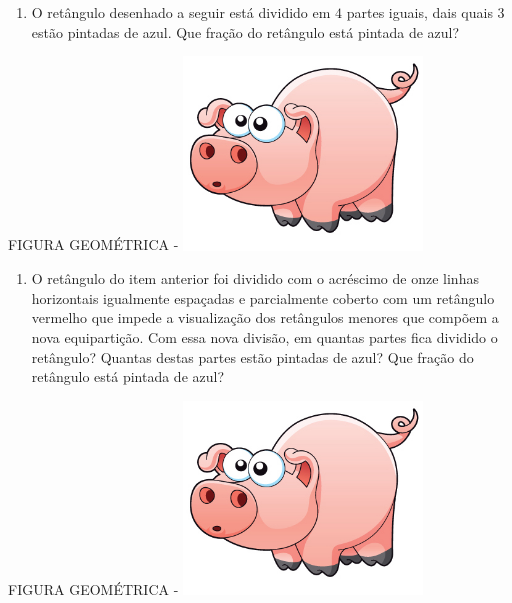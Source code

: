 \documentclass[a4,12pt]{book}
\begin{document}
\begin{enumerate} [\quad a)] %
  \item     O retângulo desenhado a seguir está dividido em     $4$     partes iguais, dais quais     $3$     estão pintadas de azul. Que fração do retângulo está pintada de azul?
\end{enumerate} %
\mbox{} \newline  \begin{imagem*}[breakable]{}{}   FIGURA GEOMÉTRICA -      \includegraphics[width=180pt, keepaspectratio]{pig}   \end{imagem*}
\begin{enumerate} [\quad a)] %
  \item     O retângulo do item anterior foi dividido com o acréscimo de onze linhas horizontais igualmente espaçadas e parcialmente coberto com um retângulo vermelho que impede a visualização dos retângulos menores que compõem a nova equipartição. Com essa nova divisão, em quantas partes fica dividido o retângulo? Quantas destas partes estão pintadas de azul? Que fração do retângulo está pintada de azul? 
\end{enumerate} %
\mbox{} \newline  \begin{imagem*}[breakable]{}{}   FIGURA GEOMÉTRICA -     \includegraphics[width=180pt, keepaspectratio]{pig}\end{imagem*}
\end{document}
